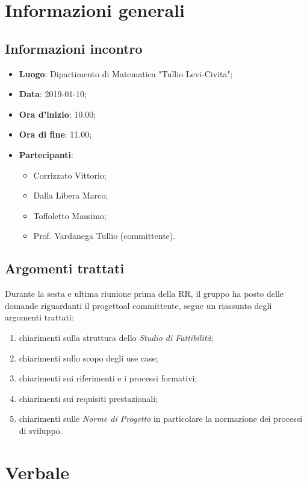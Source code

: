 \section{Informazioni generali}
    \subsection{Informazioni incontro}
        \begin{itemize}
            \item \textbf{Luogo}: Dipartimento di Matematica "Tullio Levi-Civita";
            \item \textbf{Data}: 2019-01-10;
            \item \textbf{Ora d'inizio}: 10.00;
            \item \textbf{Ora di fine}: 11.00;
            \item \textbf{Partecipanti}: \begin{itemize}
                \item Corrizzato Vittorio;
                \item Dalla Libera Marco;
                \item Toffoletto Massimo;
                \item Prof. Vardanega Tullio (committente).
            \end{itemize}
        \end{itemize}
    \subsection{Argomenti trattati}
        Durante la sesta e ultima riunione prima della RR, il gruppo ha posto delle domande riguardanti il progetto\glosp al committente, segue un riassunto degli argomenti trattati:
        \begin{enumerate}
            \item chiarimenti sulla struttura dello \textit{Studio di Fattibilità};
            \item chiarimenti sullo scopo degli use case;
            \item chiarimenti sui riferimenti e i processi formativi;
            \item chiarimenti sui requisiti prestazionali;
            \item chiarimenti sulle \textit{Norme di Progetto} in particolare la normazione dei processi di sviluppo.
        \end{enumerate}
\section{Verbale}
